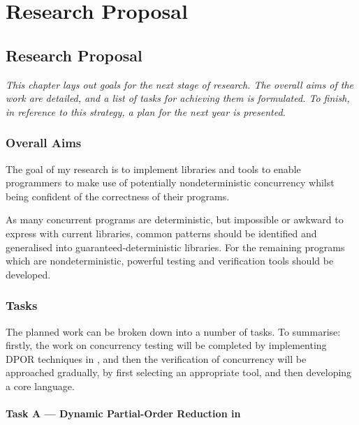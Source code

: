 \part{Research Proposal}


\chapter{Research Proposal}
\label{chp:proposal}

\textit{This chapter lays out goals for the next stage of
  research. The overall aims of the work are detailed, and a list of
  tasks for achieving them is formulated. To finish, in reference to
  this strategy, a plan for the next year is presented.}

\section{Overall Aims}
\label{sec:proposal-goals}

The goal of my research is to implement libraries and tools to enable
programmers to make use of potentially nondeterministic concurrency
whilst being confident of the correctness of their programs.

As many concurrent programs are deterministic, but impossible or
awkward to express with current libraries, common patterns should be
identified and generalised into guaranteed-deterministic
libraries. For the remaining programs which are nondeterministic,
powerful testing and verification tools should be developed.



\section{Tasks}
\label{sec:proposal-tasks}

The planned work can be broken down into a number of tasks. To
summarise: firstly, the work on concurrency testing will be completed
by implementing DPOR techniques in \dejafu{}, and then the
verification of concurrency will be approached gradually, by first
selecting an appropriate tool, and then developing a core language.

\subsection*{Task A --- Dynamic Partial-Order Reduction in \dejafu{}}
\label{sec:proposal-tasks-dpor}

